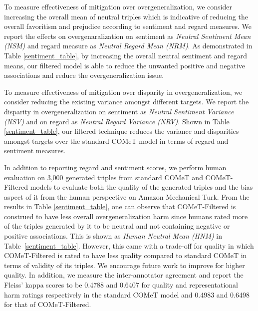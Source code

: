 
 To measure effectiveness of mitigation over overgeneralization, we consider increasing the overall mean of neutral triples which is indicative of reducing the overall favoritism and prejudice according to sentiment and regard measures. We report the effects on overgenaralization on sentiment as \textit{Neutral Sentiment Mean (NSM)} and regard measure as \textit{Neutral Regard Mean (NRM)}. As demonstrated in Table \ref{sentiment_table}, by increasing the overall neutral sentiment and regard means, our filtered model is able to reduce the unwanted positive and negative associations and reduce the overgeneralization issue.

 To measure effectiveness of mitigation over disparity in overgeneralization, we consider reducing the existing variance amongst different targets. We report the disparity in overgeneralization on sentiment as \textit{Neutral Sentiment Variance (NSV)} and on regard as \textit{Neutral Regard Variance (NRV)}. Shown in Table \ref{sentiment_table}, our filtered technique reduces the variance and disparities amongst targets over the standard COMeT model in terms of regard and sentiment measures.  


\label{human_eval}
In addition to reporting regard and sentiment scores, we perform human evaluation on 3,000 generated triples from standard COMeT and COMeT-Filtered  models to evaluate both the quality of the generated triples and the bias aspect of it from the human perspective on Amazon Mechanical Turk. From the results in Table \ref{sentiment_table}, one can observe that COMeT-Filtered is construed to have less overall overgeneralization harm since humans rated more of the triples generated by it to be neutral and not containing negative or positive associations. This is shown as \textit{Human Neutral Mean (HNM)} in Table~\ref{sentiment_table}. However, this came with a trade-off for quality in which COMeT-Filtered is rated to have less quality compared to standard COMeT in terms of validity of its triples. We encourage future work to improve for higher quality. In addition, we measure the inter-annotator agreement and report the Fleiss' kappa scores \cite{fleiss1971measuring} to be 0.4788 and 0.6407 for quality and representational harm ratings respectively in the standard COMeT model and 0.4983 and 0.6498 for that of COMeT-Filtered.
